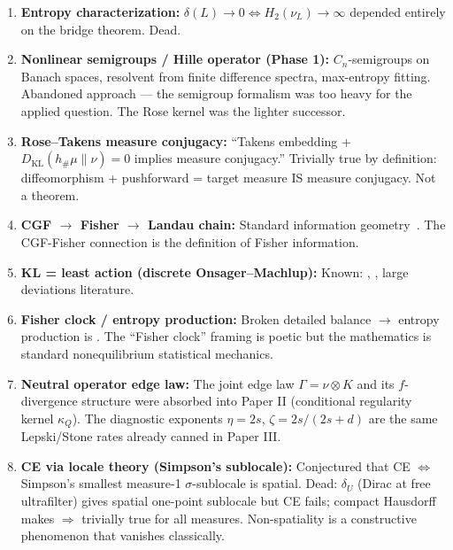 \begin{enumerate}
  \item \textbf{Entropy characterization:}
    $\delta(L) \to 0 \Leftrightarrow H_2(\nu_L) \to \infty$
    depended entirely on the bridge theorem.  Dead.

  \item \textbf{Nonlinear semigroups / Hille operator (Phase 1):}
    $C_n$-semigroups on Banach spaces, resolvent from finite
    difference spectra, max-entropy fitting.  Abandoned approach
    --- the semigroup formalism was too heavy for the applied
    question.  The Rose kernel was the lighter successor.

  \item \textbf{Rose--Takens measure conjugacy:}
    ``Takens embedding + $D_{\mathrm{KL}}(h_\#\mu \| \nu) = 0$
    implies measure conjugacy.''  Trivially true by definition:
    diffeomorphism + pushforward = target measure IS measure
    conjugacy.  Not a theorem.

  \item \textbf{CGF $\to$ Fisher $\to$ Landau chain:}
    Standard information geometry~\cite{Amari1985}.  The CGF-Fisher
    connection is the definition of Fisher information.

  \item \textbf{KL = least action (discrete Onsager--Machlup):}
    Known: \cite{Eyink1996}, \cite{MaesNetocny2003}, large
    deviations literature.

  \item \textbf{Fisher clock / entropy production:}
    Broken detailed balance $\to$ entropy production is
    \cite{Schnakenberg1976}.  The ``Fisher clock'' framing is
    poetic but the mathematics is standard nonequilibrium
    statistical mechanics.

  \item \textbf{Neutral operator edge law:}
    The joint edge law $\Gamma = \nu \otimes K$ and its
    $f$-divergence structure were absorbed into Paper II
    (conditional regularity kernel $\kappa_Q$).  The diagnostic
    exponents $\eta = 2s$, $\zeta = 2s/(2s+d)$ are the same
    Lepski/Stone rates already canned in Paper III.

  \item \textbf{CE via locale theory (Simpson's sublocale):}
    Conjectured that CE $\Leftrightarrow$ Simpson's smallest
    measure-1 $\sigma$-sublocale is spatial.  Dead: $\delta_U$
    (Dirac at free ultrafilter) gives spatial one-point sublocale
    but CE fails; compact Hausdorff makes $\Rightarrow$ trivially
    true for all measures.  Non-spatiality is a constructive
    phenomenon that vanishes classically.


\end{enumerate}
